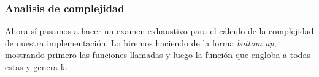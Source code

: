 \subsubsection{Analisis de complejidad}

Ahora sí pasamos a hacer un examen exhaustivo para el cálculo de la complejidad de nuestra implementación. Lo hiremos haciendo de la forma \emph{bottom up}, mostrando primero las funciones llamadas y luego la función que engloba a todas estas y genera la














